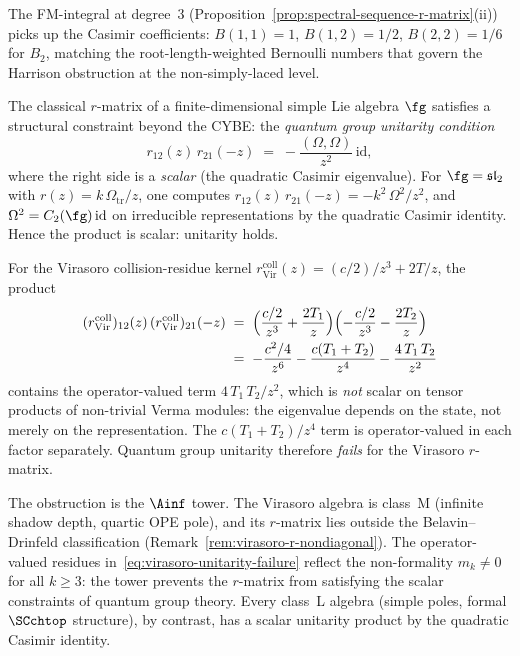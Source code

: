 \begin{computation}
The FM-integral at degree~$3$
(Proposition~\ref{prop:spectral-sequence-r-matrix}(ii))
picks up the Casimir coefficients:
$B(1,1) = 1$, $B(1,2) = 1/2$, $B(2,2) = 1/6$ for $B_2$,
matching the root-length-weighted Bernoulli numbers
that govern the Harrison obstruction at the non-simply-laced
level.
\end{computation}

\begin{remark}
\label{rem:virasoro-qg-unitarity}
The classical $r$-matrix of a finite-dimensional simple Lie
algebra $\fg$ satisfies a structural constraint beyond the CYBE:
the \emph{quantum group unitarity condition}
\begin{equation}\label{eq:qg-unitarity}
 r_{12}(z)\,r_{21}(-z) \;=\; -\frac{(\Omega,\Omega)}{z^2}\,\mathrm{id},
\end{equation}
where the right side is a \emph{scalar} (the quadratic Casimir
eigenvalue). For $\fg = \mathfrak{sl}_2$ with
$r(z) = k\,\Omega_{\mathrm{tr}}/z$, one computes
$r_{12}(z)\,r_{21}(-z) = -k^2\,\Omega^2/z^2$, and
$\Omega^2 = C_2(\fg)\,\mathrm{id}$ on irreducible representations
by the quadratic Casimir identity. Hence the product is scalar:
unitarity holds.

For the Virasoro collision-residue kernel
\(r_{\mathrm{Vir}}^{\mathrm{coll}}(z) = (c/2)/z^3 + 2T/z\), the product
\begin{align}
 (r_{\mathrm{Vir}}^{\mathrm{coll}})_{12}(z)\,
 (r_{\mathrm{Vir}}^{\mathrm{coll}})_{21}(-z)
 &\;=\;
 \Bigl(\frac{c/2}{z^3} + \frac{2T_1}{z}\Bigr)
 \Bigl(-\frac{c/2}{z^3} - \frac{2T_2}{z}\Bigr)
 \notag\\
 &\;=\;
 -\frac{c^2/4}{z^6}
 - \frac{c(T_1 + T_2)}{z^4}
 - \frac{4\,T_1\,T_2}{z^2}
 \label{eq:virasoro-unitarity-failure}
\end{align}
contains the operator-valued term $4\,T_1\,T_2/z^2$, which
is \emph{not} scalar on tensor products of non-trivial Verma
modules: the eigenvalue depends on the state, not merely on
the representation. The $c(T_1 + T_2)/z^4$ term
is operator-valued in each factor separately.
Quantum group unitarity therefore \emph{fails} for the Virasoro
$r$-matrix.

The obstruction is the $\Ainf$ tower. The Virasoro
algebra is class~M (infinite shadow depth, quartic OPE pole),
and its $r$-matrix lies outside the
Belavin--Drinfeld classification
(Remark~\ref{rem:virasoro-r-nondiagonal}). The
operator-valued residues in~\eqref{eq:virasoro-unitarity-failure}
reflect the non-formality
$m_k \ne 0$ for all $k \ge 3$: the tower prevents
the $r$-matrix from satisfying the scalar constraints of
quantum group theory. Every class~L algebra
(simple poles, formal $\SCchtop$ structure), by contrast,
has a scalar
unitarity product by the quadratic Casimir identity.
\end{remark}

